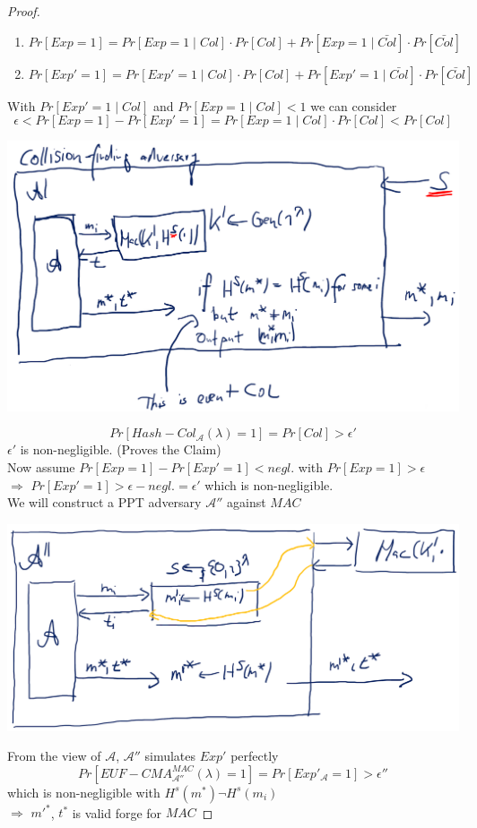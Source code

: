 \begin{proof}
\begin{enumerate}
				\item $Pr[Exp=1] = Pr[Exp=1 \mid Col] \cdot Pr[Col] + Pr[Exp=1 \mid \bar{Col}] \cdot Pr[\bar{Col}]$
				\item $Pr[Exp'=1] = Pr[Exp'=1 \mid Col] \cdot Pr[Col] + Pr[Exp'=1 \mid \bar{Col}] \cdot Pr[\bar{Col}]$
			\end{enumerate}
			With $Pr[Exp'=1 \mid Col]$ and $Pr[Exp=1 \mid Col] < 1$ we can consider
			$$\epsilon < Pr[Exp=1] - Pr[Exp'=1] = Pr[Exp=1 \mid Col] \cdot Pr[Col] < Pr[Col]$$
			\begin{center}
				\includegraphics[width=140mm]{Graphics/Authentication/a9.png}
			\end{center}
			$$Pr[Hash-Col_{\mathcal{A}}(\lambda) = 1] = Pr[Col] > \epsilon'$$
			$\epsilon'$ is non-negligible. (Proves the Claim)\\
			Now assume $Pr[Exp=1]-Pr[Exp'=1] < negl.$ with $Pr[Exp=1] > \epsilon$\\
			$\Rightarrow$ $Pr[Exp'=1] > \epsilon - negl. = \epsilon'$ which is non-negligible.\\
			We will construct a PPT adversary $\mathcal{A}''$ against $MAC$
			\begin{center}
				\includegraphics[width=140mm]{Graphics/Authentication/a10.png}
			\end{center}
			From the view of $\mathcal{A}$, $\mathcal{A}''$ simulates $Exp'$ perfectly
			$$Pr[EUF-CMA_{\mathcal{A}''}^{MAC}(\lambda) = 1] = Pr[Exp'_{\mathcal{A}} = 1] > \epsilon''$$
			which is non-negligible with $H^s(m^*) \neg H^s(m_i)$\\
			$\Rightarrow$ $m'^*$, $t^*$ is valid forge for $MAC$
		\end{proof}

